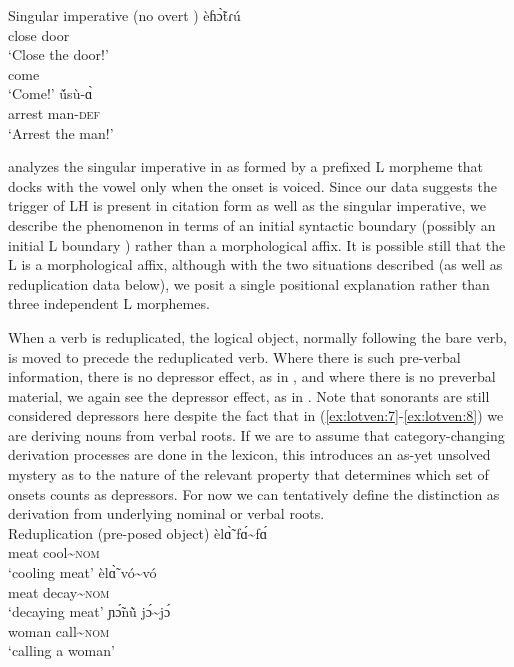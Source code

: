 \documentclass[output=paper,newtxmath,modfonts,nonflat]{langsci/langscibook}
\begin{document}
\ea\label{ex:lotven:6}Singular imperative (no overt )
\ea\label{ex:lotven:6a}
     èɦɔ̃̀tɾú\\
    close door    \\
    \glt ‘Close the door!’
\ex\label{ex:lotven:6b}
	\\
	come\\
    \glt ‘Come!’
\ex\label{ex:lotven:6c}
	 ṹsù-ɑ̀\\
    arrest man-\textsc{def}\\
    \glt ‘Arrest the man!’
\z
\z

\citet{Bradshaw1999} analyzes the singular imperative in  as formed by a prefixed L  morpheme that docks with the vowel only when the onset is voiced. Since our data suggests the trigger of LH is present in citation form as well as the singular imperative, we describe the phenomenon in terms of an initial syntactic boundary (possibly an initial L boundary ) rather than a morphological affix. It is possible still that the L  is a morphological affix, although with the two situations described (as well as reduplication data below), we posit a single positional explanation rather than three independent L  morphemes. 

When a verb is reduplicated, the logical object, normally following the bare verb, is moved to precede the reduplicated verb. Where there is such pre-verbal information, there is no depressor effect, as in , and where there is no preverbal material, we again see the depressor effect, as in . Note that sonorants are still considered depressors here despite the fact that in (\ref{ex:lotven:7}-\ref{ex:lotven:8}) we are deriving nouns from verbal roots. If we are to assume that category-changing derivation processes are done in the lexicon, this introduces an as-yet unsolved mystery as to the nature of the relevant property that determines which set of onsets counts as depressors. For now we can tentatively define the distinction as derivation from underlying nominal or verbal roots. 
\\
\ea\label{ex:lotven:7}Reduplication (pre-posed object)
\ea\label{ex:lotven:7a}
    \gll èlɑ̃̀ {fɑ́}{\textasciitilde}fɑ́\\
    meat  cool{\textasciitilde}\textsc{nom} \\
    \glt ‘cooling meat’
\ex\label{ex:lotven:7b}
	\gll èlɑ̃̀ {vó}{\textasciitilde}vó\\
    meat decay{\textasciitilde}\textsc{nom}\\
    \glt ‘decaying meat’
\ex\label{ex:lotven:7c}
	\gll ɲɔ̃́nũ̀ {jɔ́}{\textasciitilde}jɔ́\\
	woman call{\textasciitilde}\textsc{nom}\\
    \glt ‘calling a woman’
\z
\z
\end{document}
